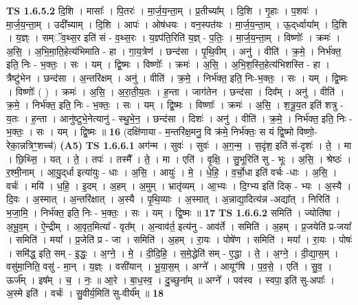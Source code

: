 \documentclass[17pt]{extarticle}
\begin{document}
                  \newline
                                \textbf{ TS 1.6.5.2} \newline
                  दि॒शि । मासाः᳚ । पि॒तरः॑ । मा॒र्ज॒य॒न्ता॒म् । प्र॒तीच्या᳚म् । दि॒शि । गृ॒हाः । प॒शवः॑ । मा॒र्ज॒य॒न्ता॒म् । उदी᳚च्याम् । दि॒शि । आपः॑ । ओष॑धयः । वन॒स्पत॑यः । मा॒र्ज॒य॒न्ता॒म् । ऊ॒द्‌र्ध्वाया᳚म् । दि॒शि । य॒ज्ञ्ः । सम्ॅव॒थ्स॒र इति॑ सं - व॒थ्स॒रः । य॒ज्ञ्प॑ति॒रिति॑ य॒ज्ञ् - प॒तिः॒ । मा॒र्ज॒य॒न्ता॒म् । विष्णोः᳚ । क्रमः॑ । अ॒सि॒ । अ॒भि॒मा॒ति॒हेत्य॑भिमाति - हा । गा॒य॒त्रेण॑ । छन्द॑सा । पृ॒थि॒वीम् । अनु॑ । वीति॑ । क्र॒मे॒ । निर्भ॑क्त॒ इति॒ निः - भ॒क्तः॒ । सः । यम् । द्वि॒ष्मः । विष्णोः᳚ । क्रमः॑ । अ॒सि॒ । अ॒भि॒श॒स्ति॒हेत्य॑भिशस्ति - हा । त्रैष्टु॑भेन । छन्द॑सा । अ॒न्तरि॑क्षम् । अनु॑ । वीति॑ । क्र॒मे॒ । निर्भ॑क्त॒ इति॒ निः-भ॒क्तः॒ । सः । यम् । द्वि॒ष्मः । विष्णोः᳚ ( ) । क्रमः॑ । अ॒सि॒ । अ॒रा॒ती॒य॒तः । ह॒न्ता । जाग॑तेन । छन्द॑सा । दिव᳚म् । अनु॑ । वीति॑ । क्र॒मे॒ । निर्भ॑क्त॒ इति॒ निः - भ॒क्तः॒ । सः । यम् । द्वि॒ष्मः । विष्णाः᳚ । क्रमः॑ । अ॒सि॒ । श॒त्रू॒य॒त इति॑ शत्रु - य॒तः । ह॒न्ता । आनु॑ष्टुभे॒नेत्यानु॑ - स्थु॒भे॒न॒ । छन्द॑सा । दिशः॑ । अनु॑ । वीति॑ । क्र॒मे॒ । निर्भ॑क्त॒ इति॒ निः - भ॒क्तः॒ । सः । यम् । द्वि॒ष्मः ॥ \textbf{  16} \newline
                  \newline
                      (दक्षि॑णाया - म॒न्तरि॑क्ष॒मनु॒ वि क्र॑मे॒ निर्भ॑क्तः॒ स यं द्वि॒ष्मो विष्णो॒- रेका॒न्नत्रिꣳ॒॒शच्च॑)  \textbf{(A5)} \newline \newline
                                \textbf{ TS 1.6.6.1} \newline
                  अग॑न्म । सुवः॑ । सुवः॑ । अ॒ग॒न्म॒ । स॒दृंश॒ इति॑ सं-दृशः॑ । ते॒ । मा । छि॒थ्सि॒ । यत् । ते॒ । तपः॑ । तस्मै᳚ । ते॒ । मा । एति॑ । वृ॒क्षि॒ । सु॒भूरिति॑ सु - भूः । अ॒सि॒ । श्रेष्ठः॑ । र॒श्मी॒नाम् । आ॒यु॒द्‌र्धा इत्या॑युः - धाः । अ॒सि॒ । आयुः॑ । मे॒ । धे॒हि॒ । व॒र्चो॒धा इति॑ वर्चः -धाः । अ॒सि॒ । वर्चः॑ । मयि॑ । ध॒हि॒ । इ॒दम् । अ॒हम् । अ॒मुम् । भ्रातृ॑व्यम् । आ॒भ्यः । दि॒ग्भ्य इति॑ दिक् - भ्यः । अ॒स्यै । दि॒वः । अ॒स्मात् । अ॒न्तरि॑क्षात् । अ॒स्यै । पृ॒थि॒व्याः । अ॒स्मात् । अ॒न्नाद्या॒दित्य॑न्न -अद्या᳚त् । निरिति॑ । भ॒जा॒मि॒ । निर्भ॑क्त॒ इति॒ निः - भ॒क्तः॒ । सः । यम् । द्वि॒ष्मः ॥ \textbf{  17} \newline
                  \newline
                                \textbf{ TS 1.6.6.2} \newline
                  समिति॑ । ज्योति॑षा । अ॒भू॒व॒म् । ऐ॒न्द्रीम् । आ॒वृत॒मित्या᳚ - वृत᳚म् । अ॒न्वाव॑र्त॒ इत्य॑नु - आव॑र्ते । समिति॑ । अ॒हम् । प्र॒जयेति॑ प्र-जया᳚ । समिति॑ । मया᳚ । प्र॒जेति॑ प्र - जा । समिति॑ । अ॒हम् । रा॒यः । पोषे॑ण । समिति॑ । मया᳚ । रा॒यः । पोषः॑ । समि॑द्ध॒ इति॒ सम् - इ॒द्धः॒ । अ॒ग्ने॒ । मे॒ । दी॒दि॒हि॒ । स॒मे॒द्धेति॑ सम् - ए॒द्धा । ते॒ । अ॒ग्ने॒ । दी॒द्या॒स॒म् । वसु॑मा॒निति॒ वसु॑ - मा॒न् । य॒ज्ञ्ः । वसी॑यान् । भू॒या॒स॒म् । अग्ने᳚ । आयूꣳ॑षि । प॒व॒से॒ । एति॑ । सु॒व॒ । ऊर्ज᳚म् । इष᳚म् । च॒ । नः॒ ॥ आ॒रे । बा॒ध॒स्व॒ । दु॒च्छुना᳚म् ॥ अग्ने᳚ । पव॑स्व । स्वपा॒ इति॑ सु-अपाः᳚ । अ॒स्मे इति॑ । वर्चः॑ । सु॒वीर्य॒मिति॑ सु-वीर्य᳚म् ॥ \textbf{  18} \newline
\end{document}
